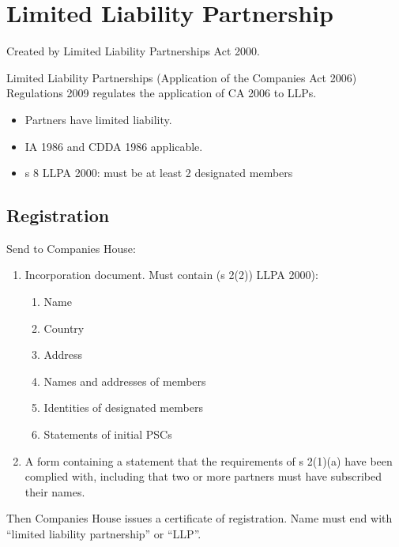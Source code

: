 \documentclass[
]{article}
\providecommand{\tightlist}{%
  \setlength{\itemsep}{0pt}\setlength{\parskip}{0pt}}
\begin{document}
\hypertarget{limited-liability-partnership-1}{%
\section{Limited Liability
Partnership}\label{limited-liability-partnership-1}}

Created by Limited Liability Partnerships Act 2000.

Limited Liability Partnerships (Application of the Companies Act 2006)
Regulations 2009 regulates the application of CA 2006 to LLPs.

\begin{itemize}
\tightlist
\item
  Partners have limited liability.
\item
  IA 1986 and CDDA 1986 applicable.
\item
  s 8 LLPA 2000: must be at least 2 designated members
\end{itemize}

\hypertarget{registration}{%
\subsection{Registration}\label{registration}}

Send to Companies House:

\begin{enumerate}
\tightlist
\item
  Incorporation document. Must contain (s 2(2)) LLPA 2000):

  \begin{enumerate}
  \tightlist
  \item
    Name
  \item
    Country
  \item
    Address
  \item
    Names and addresses of members
  \item
    Identities of designated members
  \item
    Statements of initial PSCs
  \end{enumerate}
\item
  A form containing a statement that the requirements of s 2(1)(a) have
  been complied with, including that two or more partners must have
  subscribed their names.
\end{enumerate}

Then Companies House issues a certificate of registration. Name must end
with ``limited liability partnership'' or ``LLP''.
\end{document}
